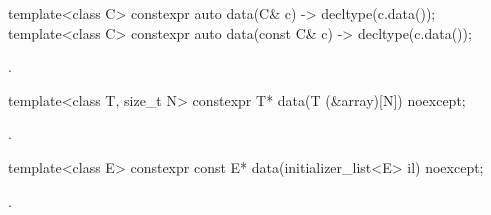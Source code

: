 %
\begin{itemdecl}
template<class C> constexpr auto data(C& c) -> decltype(c.data());
template<class C> constexpr auto data(const C& c) -> decltype(c.data());
\end{itemdecl}
\begin{itemdescr}
\pnum
\returns
{}.
\end{itemdescr}

%
\begin{itemdecl}
template<class T, size_t N> constexpr T* data(T (&array)[N]) noexcept;
\end{itemdecl}
\begin{itemdescr}
\pnum
\returns
{}.
\end{itemdescr}

%
\begin{itemdecl}
template<class E> constexpr const E* data(initializer_list<E> il) noexcept;
\end{itemdecl}
\begin{itemdescr}
\pnum
\returns
{}.
\end{itemdescr}
